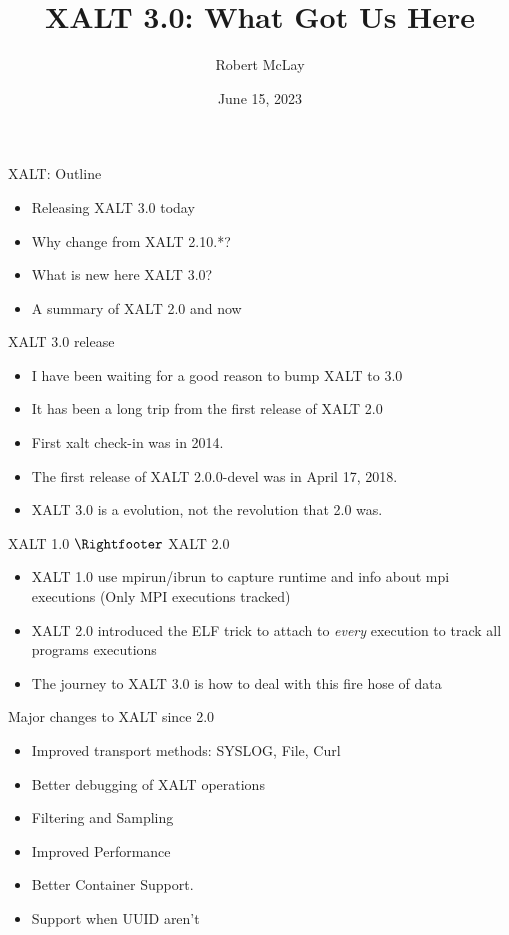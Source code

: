 \documentclass{beamer}
\begin{document}
\title[XALT]{XALT 3.0: What Got Us Here}
\author{Robert McLay}
\date{June 15, 2023}

\frame{\titlepage}

\begin{frame}{XALT: Outline}
  \begin{itemize}
    \item Releasing XALT 3.0 today
    \item Why change from XALT 2.10.*?
    \item What is new here XALT 3.0?
    \item A summary of XALT 2.0 and now
  \end{itemize}
\end{frame}

\begin{frame}{XALT 3.0 release}
  \begin{itemize}
    \item I have been waiting for a good reason to bump XALT to 3.0
    \item It has been a long trip from the first release of XALT 2.0
    \item First xalt check-in was in 2014.
    \item The first release of XALT 2.0.0-devel was in April 17, 2018.
    \item XALT 3.0 is a evolution, not the revolution that 2.0 was.
  \end{itemize}
\end{frame}

\begin{frame}{XALT 1.0 $\Rightfooter$ XALT 2.0}
  \begin{itemize}
    \item XALT 1.0 use mpirun/ibrun to capture runtime and info about
      mpi executions (Only MPI executions tracked)
    \item XALT 2.0 introduced the ELF trick to attach to \emph{every}
      execution to track all programs executions
    \item The journey to XALT 3.0 is how to deal with this fire hose of
      data
  \end{itemize}
\end{frame}

\begin{frame}{Major changes to XALT since 2.0}
  \begin{itemize}
    \item Improved transport methods: SYSLOG, File, Curl
    \item Better debugging of XALT operations
    \item Filtering and Sampling
    \item Improved Performance
    \item Better Container Support.
    \item Support when UUID aren't
  \end{itemize}
\end{frame}
\end{document}
